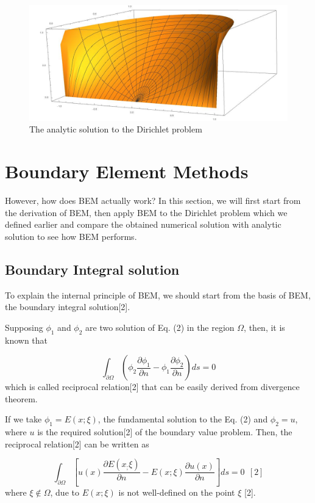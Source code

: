 \documentclass[a4paper,12pt]{article}
\begin{document}
\begin{figure}[H]
\centering
\includegraphics[scale=0.3]{analytic.jpg}
\caption{The analytic solution to the Dirichlet problem}
\end{figure}

\section{Boundary Element Methods}
However, how does BEM actually work? In this section, we will first start from the derivation of BEM, then apply BEM to the Dirichlet problem which we defined earlier and compare the obtained numerical solution with analytic solution to see how BEM performs.
\subsection{Boundary Integral solution}
\par To explain the internal principle of BEM, we should start from the basis of BEM, the boundary integral solution[2].
\par Supposing $\phi_1$ and $\phi_2$ are two solution of Eq. (2) in the region $\Omega$, then, it is known that

\begin{equation}
\int_{\partial \Omega} (\phi_2 \frac{\partial \phi_1}{\partial n} - \phi_1 \frac{\partial \phi_2}{\partial n}) ds = 0
\end{equation}
which is called reciprocal relation[2] that can be easily derived from divergence theorem. 

\par If we take $\phi_1 = E(x;\xi)$, the fundamental solution to the Eq. (2) and $\phi_2 = u$, where $u$ is the required solution[2] of the boundary value problem. Then, the reciprocal relation[2] can be written as

\begin{equation}
\int_{\partial \Omega} [u(x)\frac{\partial E(x_;\xi)}{\partial n} - E(x;\xi) \frac{\partial u(x)}{\partial n}] ds = 0 \ \ [2]
\end{equation}
where $\xi \notin \Omega$, due to $E(x;\xi)$ is not well-defined on the point $\xi$ [2]. 
\end{document}
